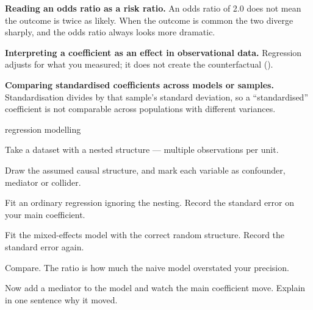 \begin{pitfall}
\textbf{Reading an odds ratio as a risk ratio.} An odds ratio of 2.0 does not
mean the outcome is twice as likely. When the outcome is common the two diverge
sharply, and the odds ratio always looks more dramatic.

\medskip
\textbf{Interpreting a coefficient as an effect in observational data.}
Regression adjusts for what you measured; it does not create the counterfactual
().

\medskip
\textbf{Comparing standardised coefficients across models or samples.}
Standardisation divides by that sample's standard deviation, so a
``standardised'' coefficient is not comparable across populations with
different variances.
\end{pitfall}

\begin{traditions}{regression modelling}
\end{traditions}

\begin{lab}
Take a dataset with a nested structure --- multiple observations per unit.

\begin{tightnum}
  \item Draw the assumed causal structure, and mark each variable as confounder,
    mediator or collider.
  \item Fit an ordinary regression ignoring the nesting. Record the standard
    error on your main coefficient.
  \item Fit the mixed-effects model with the correct random structure. Record
    the standard error again.
  \item Compare. The ratio is how much the naive model overstated your
    precision.
  \item Now add a mediator to the model and watch the main coefficient move.
    Explain in one sentence why it moved.
\end{tightnum}
\end{lab}

